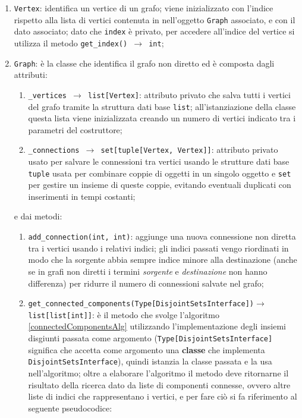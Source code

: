 \begin{enumerate}
      \item \texttt{Vertex}: identifica un vertice di un grafo; viene inizializzato con l'indice rispetto
            alla lista di vertici contenuta in nell'oggetto \texttt{Graph} associato, e con il dato associato;
            dato che \texttt{index} è privato, per accedere all'indice del vertice si utilizza il metodo
            \texttt{get\_index() $\rightarrow$ int};\newpage
      \item \texttt{Graph}: è la classe che identifica il grafo non diretto ed è composta dagli attributi:
            \begin{enumerate}
                  \item \texttt{\_vertices $\rightarrow$ list[Vertex]}: attributo privato che salva tutti i
                        vertici del grafo tramite la struttura dati base \texttt{list}; all'istanziazione
                        della classe questa lista viene inizializzata creando un numero di vertici indicato
                        tra i parametri del costruttore;
                  \item \texttt{\_connections $\rightarrow$ set[tuple[Vertex, Vertex]]}: attributo privato usato
                        per salvare le connessioni tra vertici usando le strutture dati base \texttt{tuple} usata
                        per combinare coppie di oggetti in un singolo oggetto e \texttt{set} per gestire un insieme
                        di queste coppie, evitando eventuali duplicati con inserimenti in tempi costanti;
            \end{enumerate}
            e dai metodi:
            \begin{enumerate}[resume]
                  \item \texttt{add\_connection(int, int)}: aggiunge una nuova connessione non diretta tra i vertici
                        usando i relativi indici; gli indici passati vengo riordinati in modo che la sorgente abbia
                        sempre indice minore alla destinazione (anche se in grafi non diretti i termini \textit{sorgente}
                        e \textit{destinazione} non hanno differenza) per ridurre il numero di connessioni salvate nel grafo;
                  \item \texttt{get\_connected\_components(Type[DisjointSetsInterface])\linebreak $\rightarrow$ list[list[int]]}:
                        è il metodo che svolge l'algoritmo \ref{connectedComponentsAlg} utilizzando l'implementazione degli
                        insiemi disgiunti passata come argomento (\texttt{Type[DisjointSetsInterface]} significa che accetta come
                        argomento una \textbf{classe} che implementa \texttt{DisjointSetsInterface}), quindi istanzia la classe
                        passata e la usa nell'algoritmo; oltre a elaborare l'algoritmo il metodo deve ritornarne il risultato
                        della ricerca dato da liste di componenti connesse, ovvero altre liste di indici che rappresentano i vertici,
                        e per fare ciò si fa riferimento al seguente pseudocodice:


\end{enumerate}
\end{enumerate}
